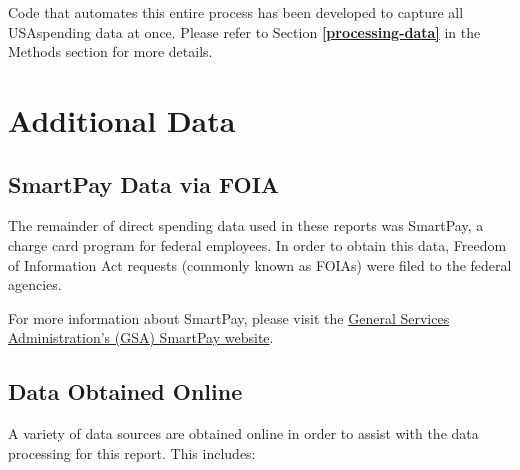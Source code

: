 \documentclass[
]{book}
\begin{document}
Code that automates this entire process has been developed to capture all USAspending data at once. Please refer to Section \textbf{\ref{processing-data}} in the Methods section for more details.

\hypertarget{additional}{%
\section{Additional Data}\label{additional}}

\hypertarget{smartpay}{%
\subsection{SmartPay Data via FOIA}\label{smartpay}}

The remainder of direct spending data used in these reports was SmartPay, a charge card program for federal employees. In order to obtain this data, Freedom of Information Act requests (commonly known as FOIAs) were filed to the federal agencies.

For more information about SmartPay, please visit the \href{https://www.gsa.gov/travel/plan-book/gsa-smartpay}{General Services Administration's (GSA) SmartPay website}.

\hypertarget{online-data}{%
\subsection{Data Obtained Online}\label{online-data}}

A variety of data sources are obtained online in order to assist with the data processing for this report. This includes:
\end{document}
